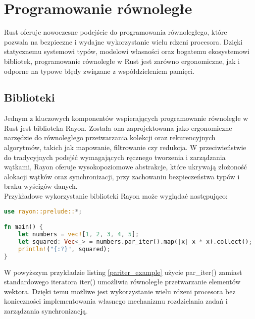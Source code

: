 \section{Programowanie równoległe}
Rust oferuje nowoczesne podejście do programowania równoległego, które pozwala na bezpieczne i wydajne wykorzystanie wielu rdzeni procesora. Dzięki statycznemu systemowi typów, modelowi własności oraz bogatemu ekosystemowi bibliotek, programowanie równoległe w Rust jest zarówno ergonomiczne, jak i odporne na typowe błędy związane z współdzieleniem pamięci.
\subsection{Biblioteki}
Jednym z kluczowych komponentów wspierających programowanie równoległe w Rust jest biblioteka Rayon. Została ona zaprojektowana jako ergonomiczne narzędzie do równoległego przetwarzania kolekcji oraz rekurencyjnych algorytmów, takich jak mapowanie, filtrowanie czy redukcja. W przeciwieństwie do tradycyjnych podejść wymagających ręcznego tworzenia i zarządzania wątkami, Rayon oferuje wysokopoziomowe abstrakcje, które ukrywają złożoność alokacji wątków oraz synchronizacji, przy zachowaniu bezpieczeństwa typów i braku wyścigów danych.\\
Przykładowe wykorzystanie biblioteki Rayon może wyglądać następująco:
\begin{lstlisting}[language=Rust, caption=Przykład użycia par\_iter, label=pariter_example]
use rayon::prelude::*;

fn main() {
    let numbers = vec![1, 2, 3, 4, 5];
    let squared: Vec<_> = numbers.par_iter().map(|x| x * x).collect();
    println!("{:?}", squared);
}
\end{lstlisting}
W powyższym przykładzie listing \ref{pariter_example} użycie par\_iter() zamiast standardowego iteratora iter() umożliwia równoległe przetwarzanie elementów wektora. Dzięki temu możliwe jest wykorzystanie wielu rdzeni procesora bez konieczności implementowania własnego mechanizmu rozdzielania zadań i zarządzania synchronizacją.